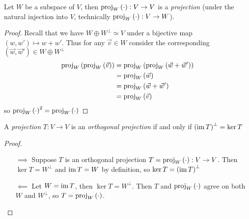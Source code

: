 \begin{theorem}
  Let $W$ be a subspace of $V$, then $\proj[W]{\cdot} : V \to V$ is a \emph{projection} (under the natural injection into $V$, technically $\proj[W]{\cdot} : V \to W$).
\end{theorem}
\begin{proof}
  Recall that we have $W \oplus W^\perp \simeq V$ under a bijective map $(w, w') \mapsto w + w'$. Thus for any $\vec v \in W$ consider the corresponding $(\vec w, \vec w') \in W \oplus W^\perp$
  \begin{align}
    \proj[W]{\proj[W]{\vec v}}
      &= \proj[W]{\proj[W]{\vec w + \vec w'}} \\
      &= \proj[W]{\vec w} \\
      &= \proj[W]{\vec w + \vec w'} \\
      &= \proj[W]{\vec v}
  \end{align}
  so $\proj[W]{\cdot}^2 = \proj[W]{\cdot}$
\end{proof}

\begin{theorem}
  A \emph{projection} $T : V \to V$ is an \emph{orthogonal projection} if and only if $\paren{\im T}^\perp = \ker T$
\end{theorem}
\begin{proof}
  \begin{itemize}
    \item[$\implies$] Suppose $T$ is an orthogonal projection $T = \proj[W]{\cdot} : V \to V$.
      Then $\ker T = W^\perp$ and $\im T = W$ by definition, so $\ker T = \paren{\im T}^\perp$
    \item[$\impliedby$] Let $W = \im T$, then $\ker T = W^\perp$.
      Then $T$ and $\proj[W]{\cdot}$ agree on both $W$ and $W^\perp$, so $T = \proj[W]{\cdot}$.
  \end{itemize}
\end{proof}

